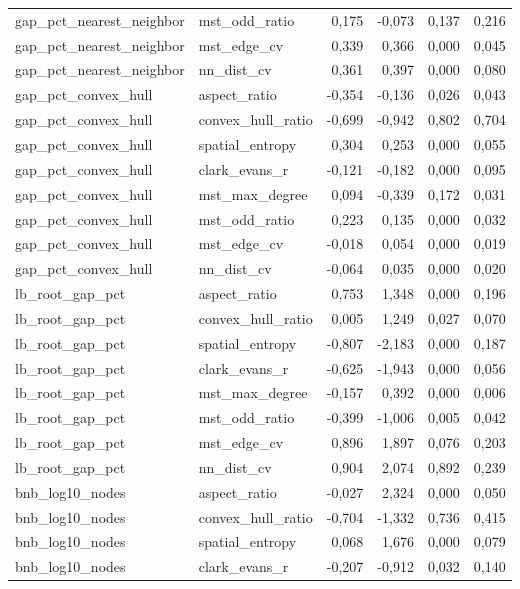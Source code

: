 \begin{tabular}{llrrrr}
gap\_pct\_nearest\_neighbor & mst\_odd\_ratio & 0,175 & -0,073 & 0,137 & 0,216 \\
gap\_pct\_nearest\_neighbor & mst\_edge\_cv & 0,339 & 0,366 & 0,000 & 0,045 \\
gap\_pct\_nearest\_neighbor & nn\_dist\_cv & 0,361 & 0,397 & 0,000 & 0,080 \\
gap\_pct\_convex\_hull & aspect\_ratio & -0,354 & -0,136 & 0,026 & 0,043 \\
gap\_pct\_convex\_hull & convex\_hull\_ratio & -0,699 & -0,942 & 0,802 & 0,704 \\
gap\_pct\_convex\_hull & spatial\_entropy & 0,304 & 0,253 & 0,000 & 0,055 \\
gap\_pct\_convex\_hull & clark\_evans\_r & -0,121 & -0,182 & 0,000 & 0,095 \\
gap\_pct\_convex\_hull & mst\_max\_degree & 0,094 & -0,339 & 0,172 & 0,031 \\
gap\_pct\_convex\_hull & mst\_odd\_ratio & 0,223 & 0,135 & 0,000 & 0,032 \\
gap\_pct\_convex\_hull & mst\_edge\_cv & -0,018 & 0,054 & 0,000 & 0,019 \\
gap\_pct\_convex\_hull & nn\_dist\_cv & -0,064 & 0,035 & 0,000 & 0,020 \\
lb\_root\_gap\_pct & aspect\_ratio & 0,753 & 1,348 & 0,000 & 0,196 \\
lb\_root\_gap\_pct & convex\_hull\_ratio & 0,005 & 1,249 & 0,027 & 0,070 \\
lb\_root\_gap\_pct & spatial\_entropy & -0,807 & -2,183 & 0,000 & 0,187 \\
lb\_root\_gap\_pct & clark\_evans\_r & -0,625 & -1,943 & 0,000 & 0,056 \\
lb\_root\_gap\_pct & mst\_max\_degree & -0,157 & 0,392 & 0,000 & 0,006 \\
lb\_root\_gap\_pct & mst\_odd\_ratio & -0,399 & -1,006 & 0,005 & 0,042 \\
lb\_root\_gap\_pct & mst\_edge\_cv & 0,896 & 1,897 & 0,076 & 0,203 \\
lb\_root\_gap\_pct & nn\_dist\_cv & 0,904 & 2,074 & 0,892 & 0,239 \\
bnb\_log10\_nodes & aspect\_ratio & -0,027 & 2,324 & 0,000 & 0,050 \\
bnb\_log10\_nodes & convex\_hull\_ratio & -0,704 & -1,332 & 0,736 & 0,415 \\
bnb\_log10\_nodes & spatial\_entropy & 0,068 & 1,676 & 0,000 & 0,079 \\
bnb\_log10\_nodes & clark\_evans\_r & -0,207 & -0,912 & 0,032 & 0,140 \\

\end{tabular}
